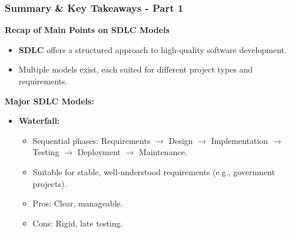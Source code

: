 \documentclass{beamer}
\begin{document}
\begin{frame}[fragile]
    \frametitle{Summary & Key Takeaways - Part 1}
    \textbf{Recap of Main Points on SDLC Models}
    
    \begin{itemize}
        \item \textbf{SDLC} offers a structured approach to high-quality software development.
        \item Multiple models exist, each suited for different project types and requirements.
    \end{itemize}
    
    \textbf{Major SDLC Models:}
    \begin{itemize}
        \item \textbf{Waterfall:}
        \begin{itemize}
            \item Sequential phases: Requirements $\rightarrow$ Design $\rightarrow$ Implementation $\rightarrow$ Testing $\rightarrow$ Deployment $\rightarrow$ Maintenance.
            \item Suitable for stable, well-understood requirements (e.g., government projects).
            \item Pros: Clear, manageable.
            \item Cons: Rigid, late testing.
        \end{itemize}
    \end{itemize}
\end{frame}
\end{document}
